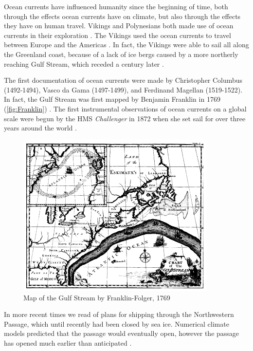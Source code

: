 Ocean currents have influenced humanity since the beginning of time, both
through the effects ocean currents have on climate, but also through the effects
they have on human travel. Vikings and Polynesians both made use of ocean
currents in their exploration \cite{Dijkstra08, Ingstad}. The Vikings used the
ocean currents to travel between Europe and the Americas \cite{Ingstad}. In
fact, the Vikings were able to sail all along the Greenland coast, because of a
lack of ice bergs caused by a more northerly reaching Gulf Stream, which receded
a century later \cite{Morner95}.

The first documentation of ocean currents were made by Christopher Columbus
(1492-1494), Vasco da Gama (1497-1499), and Ferdinand Magellan (1519-1522). In
fact, the Gulf Stream was first mapped by Benjamin Franklin in 1769
(\autoref{fig:Franklin}) \cite{Dijkstra08, Vallis06}. The first instrumental
observations of ocean currents on a global scale were begun by the HMS
\emph{Challenger} in 1872 when she set sail for over three years around the
world \cite{Siedler01}.

\begin{figure}%
  \begin{center}
    \includegraphics[scale=0.5]{Figures/Franklin-Folger.png}
    \caption{Map of the Gulf Stream by Franklin-Folger, 1769}
    \label{fig:Franklin}
  \end{center}
\end{figure}

In more recent times we read of plans for shipping through the Northwestern
Passage, which until recently had been closed by sea ice. Numerical climate
models predicted that the passage would eventually open, however the passage has
opened much earlier than anticipated \cite{NatGeo}.

